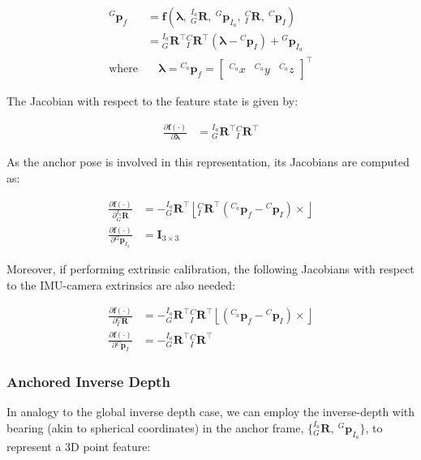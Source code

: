 \begin{align*} {}^{G}\mathbf{p}_f &= \mathbf f(\boldsymbol\lambda,~{}^{I_a}_{G}\mathbf{R},~{}^{G}\mathbf{p}_{I_a},~{}^{C}_{I}\mathbf{R},~{}^{C}\mathbf{p}_{I}) \\ &= {}^{I_a}_{G}\mathbf{R}^\top{}^{C}_{I}\mathbf{R}^\top( \boldsymbol\lambda -{}^{C}\mathbf{p}_{I}) + {}^{G}\mathbf{p}_{I_a} \\ \text{where} &\quad \boldsymbol\lambda = {}^{C_a}\mathbf{p}_f = \begin{bmatrix} {}^{C_a}x & {}^{C_a}y & {}^{C_a}z \end{bmatrix}^\top \end{align*}

The Jacobian with respect to the feature state is given by\+:

\begin{align*} \frac{\partial \mathbf f(\cdot)}{\partial \boldsymbol\lambda} &= {}^{I_a}_{G}\mathbf{R}^\top{}^{C}_{I}\mathbf{R}^\top \end{align*}

As the anchor pose is involved in this representation, its Jacobians are computed as\+:

\begin{align*} \frac{\partial \mathbf f(\cdot)}{\partial {}^{I_a}_{G}\mathbf{R}} &= -{}^{I_a}_{G}\mathbf{R}^\top \left\lfloor{}^{C}_{I}\mathbf{R}^\top({}^{C_a}\mathbf{p}_f-{}^{C}\mathbf{p}_{I}) \times\right\rfloor \\ \frac{\partial \mathbf f(\cdot)}{\partial {}^{G}\mathbf{p}_{I_a}} &= \mathbf{I}_{3\times 3} \end{align*}

Moreover, if performing extrinsic calibration, the following Jacobians with respect to the I\+M\+U-\/camera extrinsics are also needed\+:

\begin{align*} \frac{\partial \mathbf f(\cdot)}{\partial {}^{C}_{I}\mathbf{R}} &= -{}^{I_a}_{G}\mathbf{R}^\top{}^{C}_{I}\mathbf{R}^\top \left\lfloor({}^{C_a}\mathbf{p}_f-{}^{C}\mathbf{p}_{I}) \times\right\rfloor \\ \frac{\partial \mathbf f(\cdot)}{\partial {}^{C}\mathbf{p}_{I}} &= -{}^{I_a}_{G}\mathbf{R}^\top{}^{C}_{I}\mathbf{R}^\top \end{align*}\hypertarget{update-feat_feat-rep-anchor-inv}{}\subsubsection{Anchored Inverse Depth}\label{update-feat_feat-rep-anchor-inv}
In analogy to the global inverse depth case, we can employ the inverse-\/depth with bearing (akin to spherical coordinates) in the anchor frame, $\{{}^{I_a}_{G}\mathbf{R},~{}^{G}\mathbf{p}_{I_a}\}$, to represent a 3D point feature\+:


